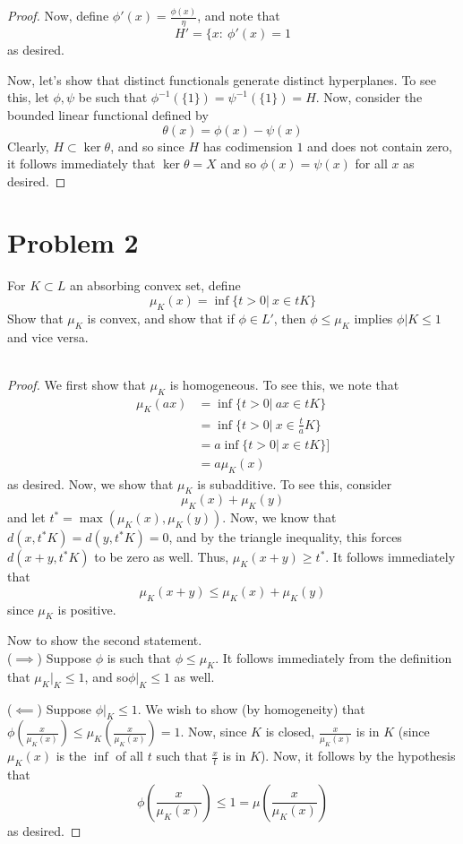 \documentclass[fontsize=11pt]{scrartcl} %
\numberwithin{equation}{section} %
\numberwithin{figure}{section} %
\numberwithin{table}{section} %
\begin{document}
\begin{proof}
    Now, define $\phi'(x) = \frac{\phi(x)}{\eta}$, and note that
    \[
        H' = \{x:\ \phi'(x)=1
    \]
    as desired.

    Now, let's show that distinct functionals generate distinct hyperplanes. To
    see this, let $\phi,\psi$ be such that
    $\phi^{-1}(\{1\})=\psi^{-1}(\{1\})=H$. Now, consider the bounded linear
    functional defined by
    \[
        \theta(x) = \phi(x)-\psi(x)
    \]
    Clearly, $H\subset\ker\theta$, and so since $H$ has codimension $1$ and does
    not contain zero, it follows immediately that $\ker\theta=X$ and so $\phi(x)
    = \psi(x)$ for all $x$ as desired.
\end{proof}


\section*{Problem 2}
For $K\subset L$ an absorbing convex set, define
\[
    \mu_K(x) = \inf\{t>0|\ x\in tK\}
\]
Show that $\mu_K$ is convex, and show that if $\phi\in L'$, then $\phi\leq \mu_K$
implies $\phi|K\leq 1$ and vice versa.
\\
\\
\begin{proof}
    We first show that $\mu_K$ is homogeneous. To see this, we note that
    \[
        \begin{aligned}
            \mu_K(ax) &= \inf\{t>0|\ ax\in tK\}\\
                    &= \inf\{t>0|\ x\in \frac{t}{a}K\}\\
                    &=a\inf\{t>0|\ x\in tK\}]\\
                    &= a\mu_K(x)
        \end{aligned}
    \]
    as desired. Now, we show that $\mu_K$ is subadditive. To see this, consider
    \[
        \mu_K(x) + \mu_K(y)
    \]
    and let $t^* = \max(\mu_K(x),\mu_K(y))$. Now, we know that $d(x,t^*K) =
    d(y,t^*K)=0$, and by the triangle inequality, this forces $d(x+y,t^*K)$ to
    be zero as well. Thus, $\mu_K(x+y)\geq t^*$. It follows immediately that
    \[
        \mu_K(x+y)\leq \mu_K(x)+\mu_K(y)
    \]
    since $\mu_K$ is positive.

    Now to show the second statement.
    \\
    ($\implies$)
    Suppose $\phi$ is such that $\phi\leq \mu_K$. It follows immediately from
    the definition that $\mu_K|_K\leq 1$, and so$\phi|_K\leq 1$ as well.

    ($\impliedby$)
    Suppose $\phi|_K\leq 1$. We wish to show (by homogeneity) that
    $\phi(\frac{x}{\mu_K(x)})\leq\mu_K(\frac{x}{\mu_K(x)})=1$. Now, since $K$ is
    closed, $\frac{x}{\mu_K(x)}$ is in $K$ (since $\mu_K(x)$ is the $\inf$ of
    all $t$ such that $\frac{x}{t}$ is in $K$). Now, it follows by the
    hypothesis that
    \[
        \phi(\frac{x}{\mu_K(x)})\leq 1=\mu(\frac{x}{\mu_K(x)})
    \]
    as desired.
\end{proof}
\end{document}
